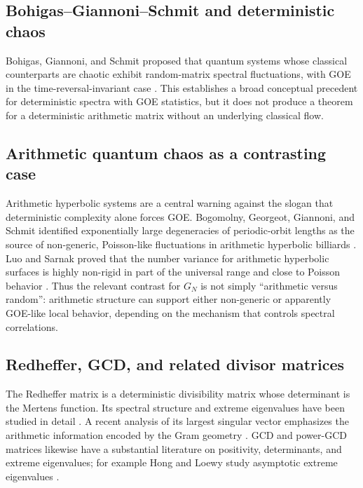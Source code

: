 \documentclass[11pt]{amsart}
\numberwithin{equation}{section}
\theoremstyle{plain}
\theoremstyle{definition}
\theoremstyle{remark}
\begin{document}
\subsection{Bohigas--Giannoni--Schmit and deterministic chaos}
\label{subsec:bgs_literature}

Bohigas, Giannoni, and Schmit proposed that quantum systems whose classical counterparts are chaotic exhibit random-matrix spectral fluctuations, with GOE in the time-reversal-invariant case \cite{BGS1984}.  This establishes a broad conceptual precedent for deterministic spectra with GOE statistics, but it does not produce a theorem for a deterministic arithmetic matrix without an underlying classical flow.

\subsection{Arithmetic quantum chaos as a contrasting case}
\label{subsec:arithmetic_quantum_chaos}

Arithmetic hyperbolic systems are a central warning against the slogan that deterministic complexity alone forces GOE.  Bogomolny, Georgeot, Giannoni, and Schmit identified exponentially large degeneracies of periodic-orbit lengths as the source of non-generic, Poisson-like fluctuations in arithmetic hyperbolic billiards \cite{BogomolnyEtAl1992}.  Luo and Sarnak proved that the number variance for arithmetic hyperbolic surfaces is highly non-rigid in part of the universal range and close to Poisson behavior \cite{LuoSarnak1994}.  Thus the relevant contrast for $G_N$ is not simply ``arithmetic versus random'': arithmetic structure can support either non-generic or apparently GOE-like local behavior, depending on the mechanism that controls spectral correlations.

\subsection{Redheffer, GCD, and related divisor matrices}
\label{subsec:redheffer_gcd}

The Redheffer matrix is a deterministic divisibility matrix whose determinant is the Mertens function.  Its spectral structure and extreme eigenvalues have been studied in detail \cite{BarrettJarvis1992}.  A recent analysis of its largest singular vector emphasizes the arithmetic information encoded by the Gram geometry \cite{ClementSteinerberger2025}.  GCD and power-GCD matrices likewise have a substantial literature on positivity, determinants, and extreme eigenvalues; for example Hong and Loewy study asymptotic extreme eigenvalues \cite{HongLoewy2004}.
\end{document}
